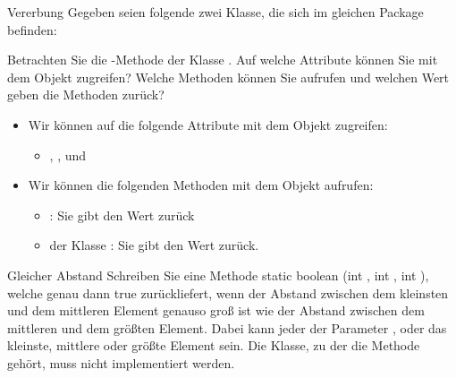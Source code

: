 \documentclass{../preamble}
\begin{document}
\clearpage

\begin{task}[credit = \stars{1}{3}]{Vererbung}
    Gegeben seien folgende zwei Klasse, die sich im gleichen Package befinden:
    
    Betrachten Sie die -Methode der Klasse . Auf welche Attribute können Sie mit dem Objekt  zugreifen? Welche Methoden können Sie aufrufen und welchen Wert geben die Methoden zurück?

    \begin{solution}
        \begin{itemize}
            \item Wir können auf die folgende Attribute mit dem Objekt  zugreifen:
                  \begin{itemize}
                      \item {}, ,  und 
                  \end{itemize}
            \item Wir können die folgenden Methoden mit dem Objekt  aufrufen:
                  \begin{itemize}
                      \item {}: Sie  gibt den Wert  zurück
                      \item {} der Klasse : Sie gibt den Wert  zurück.
                  \end{itemize}
        \end{itemize}
    \end{solution}
\end{task}

\clearpage

\begin{task}[credit = \stars{2}{3}]{Gleicher Abstand}
    Schreiben Sie eine Methode \textcolor{keywordcolor}{static} \textcolor{keywordcolor}{boolean} (\textcolor{keywordcolor}{int} , \textcolor{keywordcolor}{int} , \textcolor{keywordcolor}{int} ), welche genau dann \textcolor{keywordcolor}{true} zurückliefert,  wenn der Abstand zwischen dem kleinsten und dem mittleren Element genauso groß ist wie der Abstand zwischen dem mittleren und dem größten Element. Dabei kann jeder der Parameter ,  oder  das kleinste, mittlere oder größte Element sein. Die Klasse, zu der die Methode gehört, muss nicht implementiert werden.

    \begin{solution}
        
    \end{solution}
\end{task}
\end{document}
